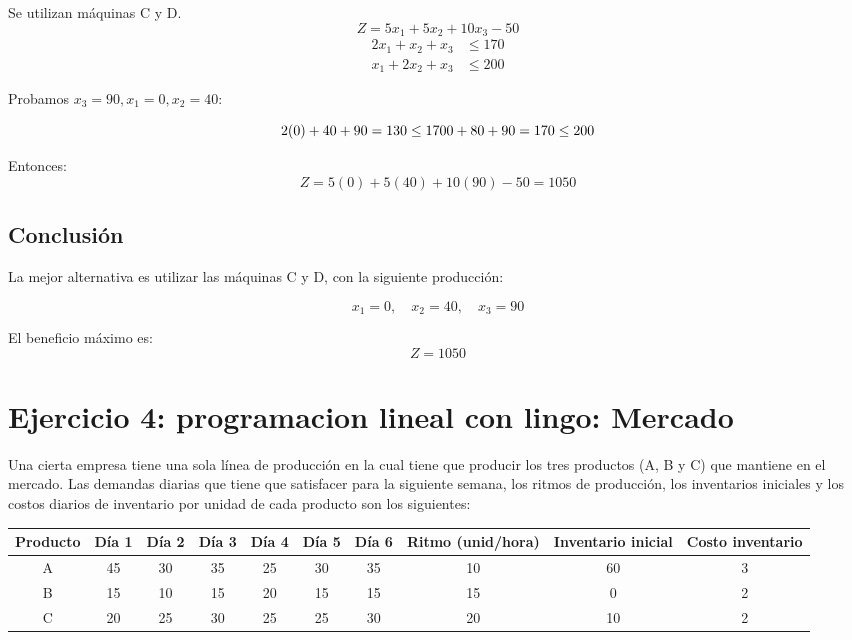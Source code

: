 \documentclass[12pt, a4paper, oneside]{book}
\theoremstyle{definition}
\begin{document}
Se utilizan máquinas C y D.  
\[
Z = 5x_1 + 5x_2 + 10x_3 - 50
\]
\[
\begin{aligned}
2x_1 + x_2 + x_3 &\leq 170 \\
x_1 + 2x_2 + x_3 &\leq 200
\end{aligned}
\]

Probamos \(x_3 = 90, x_1 = 0, x_2 = 40\):

\[
2(0) + 40 + 90 = 130 \leq 170 \\
0 + 80 + 90 = 170 \leq 200
\]

Entonces:  
\[
Z = 5(0) + 5(40) + 10(90) - 50 = 1050
\]

\subsection{Conclusión}

La mejor alternativa es utilizar las máquinas C y D, con la siguiente producción:

\[
x_1 = 0, \quad x_2 = 40, \quad x_3 = 90
\]

El beneficio máximo es:
\[
\boxed{Z = 1050}
\]


\newpage
\section{Ejercicio 4: programacion lineal con lingo: Mercado}

Una cierta empresa tiene una sola línea de producción en la cual tiene que producir los tres productos (A, B y C) que mantiene en el mercado. Las demandas diarias que tiene que satisfacer para la siguiente semana, los ritmos de producción, los inventarios iniciales y los costos diarios de inventario por unidad de cada producto son los siguientes:

\begin{center}
\begin{tabular}{|c|cccccc|c|c|c|}
\hline
\textbf{Producto} & \textbf{Día 1} & \textbf{Día 2} & \textbf{Día 3} & \textbf{Día 4} & \textbf{Día 5} & \textbf{Día 6} & \textbf{Ritmo (unid/hora)} & \textbf{Inventario inicial} & \textbf{Costo inventario} \\
\hline
A & 45 & 30 & 35 & 25 & 30 & 35 & 10 & 60 & 3 \\
B & 15 & 10 & 15 & 20 & 15 & 15 & 15 & 0 & 2 \\
C & 20 & 25 & 30 & 25 & 25 & 30 & 20 & 10 & 2 \\
\hline
\end{tabular}
\end{center}
\end{document}
